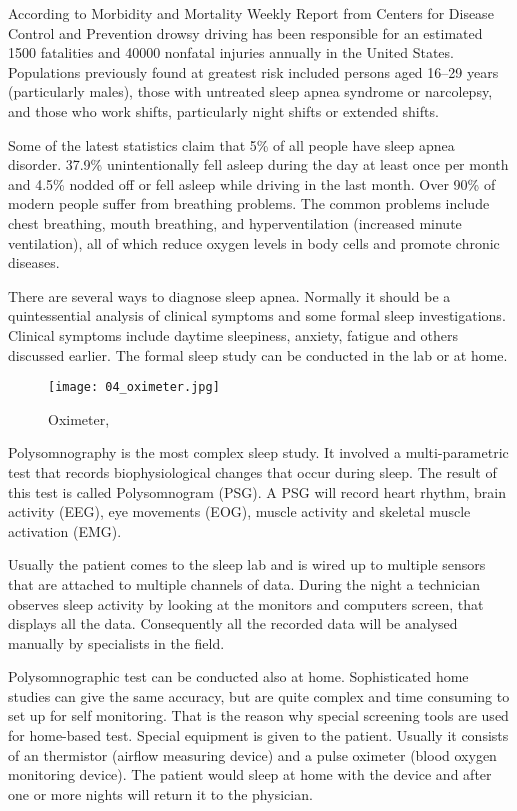 According to Morbidity and Mortality Weekly Report from Centers for Disease Control and Prevention \cite{MMWR} drowsy driving has been responsible for an estimated 1500 fatalities and 40000 nonfatal injuries annually in the United States. Populations previously found at greatest risk included persons aged 16--29 years (particularly males), those with untreated sleep apnea syndrome or narcolepsy, and those who work shifts, particularly night shifts or extended shifts.

Some of the latest statistics \cite{statistics} claim that 5\% of all people have sleep apnea disorder. 37.9\% unintentionally fell asleep during the day at least once per month and 4.5\% nodded off or fell asleep while driving in the last month. Over 90\% of modern people suffer from breathing problems. The common problems include chest breathing, mouth breathing, and hyperventilation (increased minute ventilation), all of which reduce oxygen levels in body cells and promote chronic diseases.

There are several ways to diagnose sleep apnea. Normally it should be a quintessential analysis of clinical symptoms and some formal sleep investigations. Clinical symptoms include daytime sleepiness, anxiety, fatigue and others discussed earlier. The formal sleep study can be conducted in the lab or at home. 

\begin{figure}[!ht]
\centering
\texttt{[image: 04\_oximeter.jpg]}
\caption{Oximeter, \cite{oximeter}}
\label{fig:oximeter}
\end{figure}

Polysomnography is the most complex sleep study. It involved a multi-parametric test that records biophysiological changes that occur during sleep. The result of this test is called Polysomnogram (PSG). A PSG will record heart rhythm, brain activity (EEG), eye movements (EOG), muscle activity and skeletal muscle activation (EMG). 

Usually the patient comes to the sleep lab and is wired up to multiple sensors that are attached to multiple channels of data. During the night a technician observes sleep activity by looking at the monitors and computers screen, that displays all the data. Consequently all the recorded data will be analysed manually by specialists in the field.

Polysomnographic test can be conducted also at home. Sophisticated home studies can give the same accuracy, but are quite complex and time consuming to set up for self monitoring. That is the reason why special screening tools are used for home-based test. Special equipment is given to the patient. Usually it consists of an thermistor (airflow measuring device) and a pulse oximeter (blood oxygen monitoring device). The patient would sleep at home with the device and after one or more nights will return it to the physician. 

